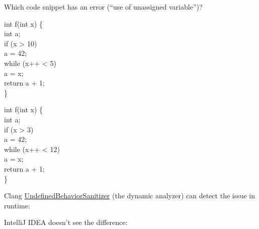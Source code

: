 \documentclass{article}
\begin{document}

\pptToc



Which code snippet has an error (``use of unassigned variable'')?

\begin{multicols}{2}
{\ttfamily
int f(int x) \{ \\
\quad  int a; \\
\quad  if (x > 10) \\
\quad\quad a = 42; \\
\quad  while (x++ < 5) \\
\quad\quad    a = x; \\
\quad  return a + 1; \\
\}}
\par\columnbreak\par
{\ttfamily
int f(int x) \{ \\
\quad  int a; \\
\quad  if (x > 3) \\
\quad\quad a = 42; \\
\quad  while (x++ < 12) \\
\quad\quad    a = x; \\
\quad  return a + 1; \\
\}}
\end{multicols}

\plush{}


\begin{multicols}{2}
\par\columnbreak\par
{}
\end{multicols}

\plush{}


Clang \href{https://clang.llvm.org/docs/UndefinedBehaviorSanitizer.html}{UndefinedBehaviorSanitizer} (the dynamic analyzer) can detect the issue in runtime:


\plush{}


IntelliJ IDEA doesn't see the difference:

\end{document}
